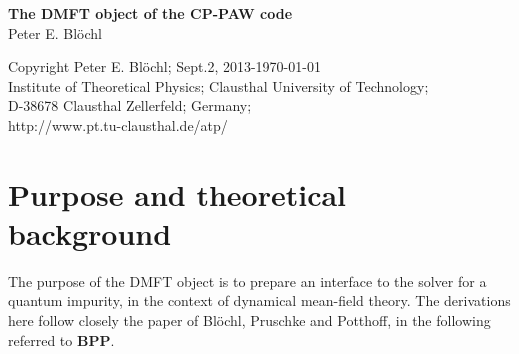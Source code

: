 \documentclass[11pt,a4paper]{report}
\begin{document}
\begin{titlepage}
\begin{center}
\vspace*{3.5cm}
{\huge \textbf{The DMFT object of the CP-PAW code}}\\
\vspace{0.5cm}
{\large Peter E. Bl\"ochl}
\vspace{0.5cm} 
\end{center}

\vfill
\begin{center}
Copyright Peter E. Bl\"ochl; Sept.2, 2013-\today\\
{\small
Institute of Theoretical Physics;
Clausthal University of Technology;\\ 
D-38678 Clausthal Zellerfeld; Germany;\\
http://www.pt.tu-clausthal.de/atp/}
\end{center}
\end{titlepage}
\noindent            
\tableofcontents
\chapter{Purpose and theoretical background}
The purpose of the DMFT object is to prepare an interface to the
solver for a quantum impurity, in the context of dynamical mean-field
theory. The derivations here follow closely the paper of Bl\"ochl,
Pruschke and Potthoff\cite{bloechl13_prb88_25139}, in the following
referred to \textbf{BPP}.

\end{document}
